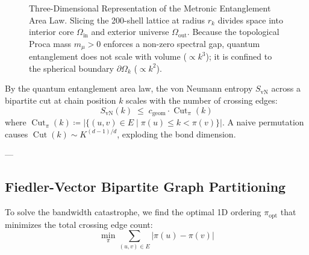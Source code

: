 \documentclass[
    12pt,
    a4paper,
    headings=normal,
    twoside=false,
    open=any,
    parskip=half
]{scrbook}
\begin{document}
\begin{figure}[htbp]
\caption{Three-Dimensional Representation of the Metronic Entanglement Area Law. Slicing the 200-shell lattice at radius $r_k$ divides space into interior core $\Omega_{\text{in}}$ and exterior universe $\Omega_{\text{out}}$. Because the topological Proca mass $m_\mu > 0$ enforces a non-zero spectral gap, quantum entanglement does not scale with volume ($\propto k^3$); it is confined to the spherical boundary $\partial\Omega_k$ ($\propto k^2$).}
\label{fig:ch4_area_law_3d}
\end{figure}

By the quantum entanglement area law, the von Neumann entropy $S_{\text{vN}}$ across a bipartite cut at chain position $k$ scales with the number of crossing edges:
\begin{equation}
S_{\text{vN}}(k) \;\le\; c_{\text{geom}} \cdot \operatorname{Cut}_\pi(k)
\label{eq:ch4_entropy_cut_bound}
\end{equation}
where $\operatorname{Cut}_\pi(k) \coloneqq |\{ (u, v) \in E \mid \pi(u) \le k < \pi(v) \}|$. A naive permutation causes $\operatorname{Cut}(k) \sim K^{(d-1)/d}$, exploding the bond dimension.

---

\subsection{Fiedler-Vector Bipartite Graph Partitioning}

To solve the bandwidth catastrophe, we find the optimal 1D ordering $\pi_{\text{opt}}$ that minimizes the total crossing edge count:
\begin{equation}
\min_{\pi} \sum_{(u, v) \in E} |\pi(u) - \pi(v)|
\label{eq:ch4_graph_1sum_problem}
\end{equation}
\end{document}
